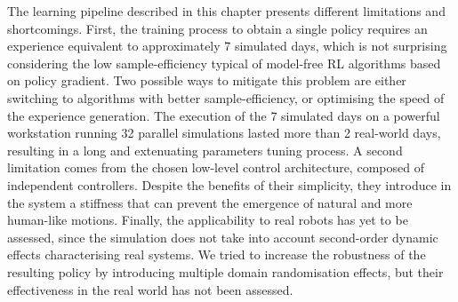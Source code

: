 The learning pipeline described in this chapter presents different limitations and shortcomings.
First, the training process to obtain a single policy requires an experience equivalent to approximately 7 simulated days, which is not surprising considering the low sample-efficiency typical of model-free \ac{RL} algorithms based on policy gradient.
Two possible ways to mitigate this problem are either switching to algorithms with better sample-efficiency, or optimising the speed of the experience generation.
The execution of the 7 simulated days on a powerful workstation running 32 parallel simulations lasted more than 2 real-world days, resulting in a long and extenuating parameters tuning process.
A second limitation comes from the chosen low-level control architecture, composed of independent \pid controllers.
Despite the benefits of their simplicity, they introduce in the system a stiffness that can prevent the emergence of natural and more human-like motions.
Finally, the applicability to real robots has yet to be assessed, since the simulation does not take into account second-order dynamic effects characterising real systems.
We tried to increase the robustness of the resulting policy by introducing multiple domain randomisation effects, but their effectiveness in the real world has not been assessed.
